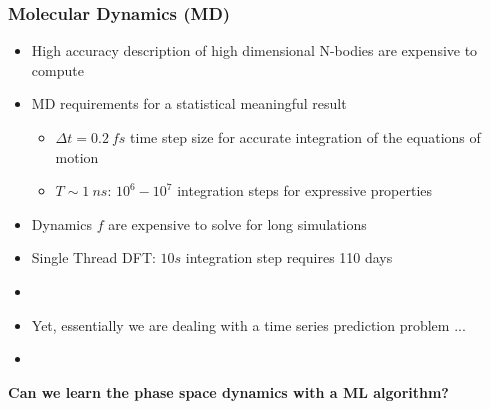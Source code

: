 \documentclass[usenames, dvipsnames, t]{beamer}
\begin{document}
\begin{frame}
	\frametitle{Molecular Dynamics (MD)}
	\begin{itemize}
		\item<+-> High accuracy description of high dimensional N-bodies are expensive to compute
		\item<+-> MD requirements for a statistical meaningful result
		\begin{itemize}
			\item $\Delta t = 0.2 \ fs$ time step size for accurate integration of the equations of motion
			\item $T \sim 1 \ ns$: $10^6 - 10^7$ integration steps for expressive properties
		\end{itemize}
		\item<+-> Dynamics $f$ are expensive to solve for long simulations
		\item<+-> Single Thread DFT: $ 10 s $ integration step requires 110 days
		\item[] 
		\item<+-> Yet, essentially we are dealing with a time series prediction problem ...
		\item[] 
	\end{itemize}
	\onslide<+->
		\begin{center}
		\textbf{Can we learn the phase space dynamics with a ML algorithm?}
		\end{center}
\end{frame}
\end{document}
